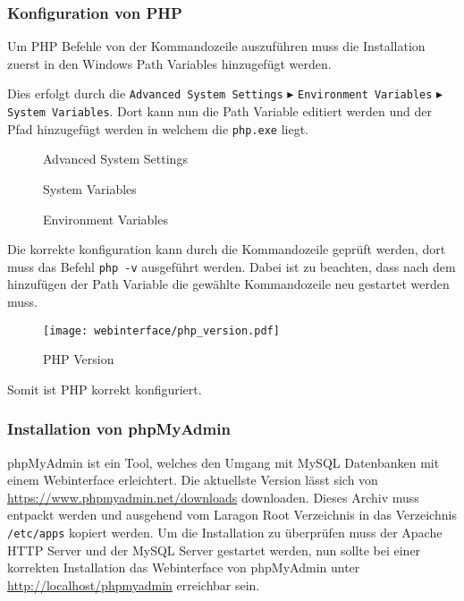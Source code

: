 \subsubsection{Konfiguration von PHP}
Um PHP Befehle von der Kommandozeile auszuführen muss die Installation zuerst in
den Windows Path Variables hinzugefügt werden.

Dies erfolgt durch die \verb|Advanced System Settings| $\blacktriangleright$
\verb|Environment Variables| $\blacktriangleright$ \verb|System Variables|. Dort
kann nun die Path Variable editiert werden und der Pfad hinzugefügt werden in
welchem die \verb|php.exe| liegt.

\begin{figure}[H]
  \centering
  \caption{Advanced System Settings}
\end{figure}

\begin{figure}[H]
  \centering
  \caption{System Variables}
\end{figure}

\begin{figure}[H]
  \centering
  \caption{Environment Variables}
\end{figure}

Die korrekte konfiguration kann durch die Kommandozeile geprüft werden, dort
muss das Befehl \verb|php -v| ausgeführt werden. Dabei ist zu beachten, dass
nach dem hinzufügen der Path Variable die gewählte Kommandozeile neu gestartet
werden muss.

\begin{figure}[H]
  \centering
  \texttt{[image: webinterface/php\_version.pdf]}
  \caption{PHP Version}
\end{figure}

Somit ist PHP korrekt konfiguriert.


\subsubsection{Installation von phpMyAdmin}
phpMyAdmin ist ein Tool, welches den Umgang mit MySQL Datenbanken mit einem
Webinterface erleichtert. Die aktuellste Version lässt sich von
\url{https://www.phpmyadmin.net/downloads} downloaden. Dieses Archiv muss
entpackt werden und ausgehend vom Laragon Root Verzeichnis in das Verzeichnis
\verb|/etc/apps| kopiert werden. Um die Installation zu überprüfen muss der
Apache HTTP Server und der MySQL Server gestartet werden, nun sollte bei einer
korrekten Installation das Webinterface von phpMyAdmin unter
\url{http://localhost/phpmyadmin} erreichbar sein.

